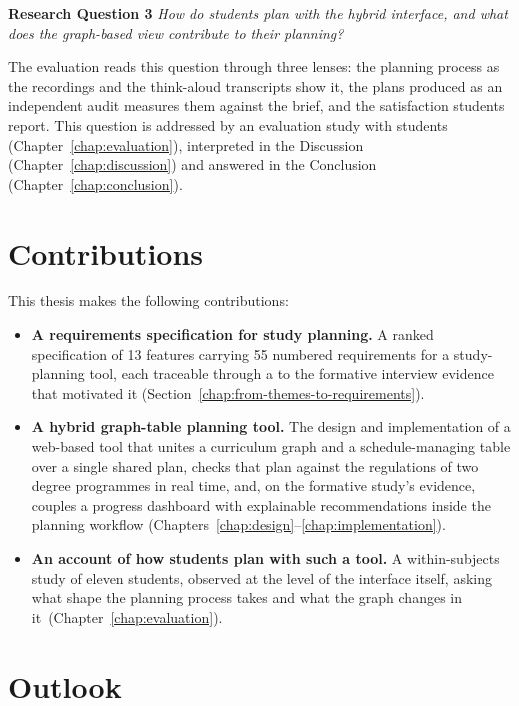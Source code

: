 \textbf{Research Question 3} \emph{How do students plan with the hybrid interface, and what does the graph-based view contribute to their planning?}

The evaluation reads this question through three lenses: the planning process as the recordings and the think-aloud transcripts show it, the plans produced as an independent audit measures them against the brief, and the satisfaction students report. This question is addressed by an evaluation study with students (Chapter~\ref{chap:evaluation}), interpreted in the Discussion (Chapter~\ref{chap:discussion}) and answered in the Conclusion (Chapter~\ref{chap:conclusion}).

\section{Contributions}
\label{sec:contributions}

This thesis makes the following contributions:

\begin{itemize}
    \item \textbf{A requirements specification for study planning.} A ranked specification of 13 features carrying 55 numbered requirements for a study-planning tool, each traceable through a  to the formative interview evidence that motivated it (Section~\ref{chap:from-themes-to-requirements}).
    \item \textbf{A hybrid graph-table planning tool.} The design and implementation of a web-based tool that unites a curriculum graph and a schedule-managing table over a single shared plan, checks that plan against the regulations of two degree programmes in real time, and, on the formative study's evidence, couples a progress dashboard with explainable recommendations inside the planning workflow (Chapters~\ref{chap:design}--\ref{chap:implementation}).
    \item \textbf{An account of how students plan with such a tool.} A within-subjects study of eleven students, observed at the level of the interface itself, asking what shape the planning process takes and what the graph changes in it~(Chapter~\ref{chap:evaluation}).
\end{itemize}

\section{Outlook}
\label{sec:outlook}

